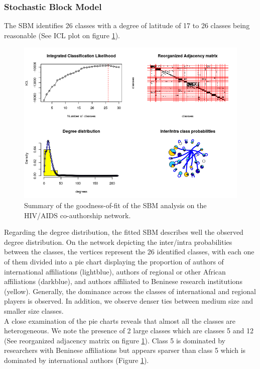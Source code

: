 \subsubsection{Stochastic Block Model}
\label{sec:hiv_results_sbm}
The SBM identifies 26 classes with a degree of latitude of 17 to 26 classes being reasonable (See ICL plot on figure \ref{fig:hiv_sbmgof}).

\begin{figure}[h!]
\centering
\hspace*{-1cm}
\includegraphics[scale=0.85]{Chapters/hiv/statMod/hiv_sbm}
\caption{Summary of the goodness-of-fit of the SBM analysis on the HIV/AIDS co-authorship network.}
\label{fig:hiv_sbmgof}
\end{figure}

Regarding the degree distribution, the fitted SBM describes well the observed degree distribution. On the network depicting the inter/intra probabilities between the classes, the vertices represent the 26 identified classes, with each one of them divided into a pie chart displaying the proportion of authors of international affiliations (lightblue), authors of regional or other African affiliations (darkblue), and authors affiliated to Beninese research institutions (yellow). Generally, the dominance across the classes of international and regional players is observed. In addition, we observe denser ties between medium size and smaller size classes. \\
A close examination of the pie charts reveals that almost all the classes are heterogeneous. We note the presence of 2 large classes which are classes 5 and 12 (See reorganized adjacency matrix on figure \ref{fig:hiv_sbmgof}). Class 5 is dominated by researchers with Beninese affiliations but appears sparser than class 5 which is dominated by international authors (Figure \ref{fig:hiv_sbmgof}). \\


